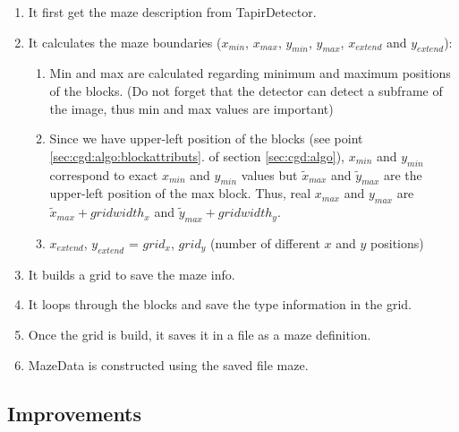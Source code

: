     \begin{enumerate}
        \item It first get the maze description from TapirDetector.
        \item It calculates the maze boundaries ($x_{min}$, $x_{max}$, 
            $y_{min}$, $y_{max}$, $x_{extend}$ and $y_{extend}$):
        \begin{enumerate}
            \item Min and max are calculated regarding minimum and maximum 
                positions of the blocks. (Do not forget that the detector 
                can detect a subframe of the image, thus min and max 
                values are important)
            \item Since we have upper-left position of the blocks (see
                point \ref{sec:cgd:algo:blockattributs}. of 
                section \ref{sec:cgd:algo}), 
                $x_{min}$ and $y_{min}$ correspond to exact $x_{min}$ 
                and $y_{min}$ values 
                but $\tilde{x}_{max}$ and $\tilde{y}_{max}$ are the upper-left position of the 
                max block. Thus, real $x_{max}$ and $y_{max}$ are 
                $\tilde{x}_{max}+gridwidth_x$ and 
                $\tilde{y}_{max}+gridwidth_y$.
            \item $x_{extend}$, $y_{extend}$ = $grid_x$, $grid_y$ 
                (number of different 
                $x$ and $y$ positions)
        \end{enumerate}
        \item It builds a grid to save the maze info.
        \item It loops through the blocks and save the type information
            in the grid.
        \item Once the grid is build, it saves it in a file as a maze
            definition. 
        \item MazeData is constructed using the saved file maze.
    \end{enumerate}

\subsection{Improvements}
\label{sec:mkd:improvements}

